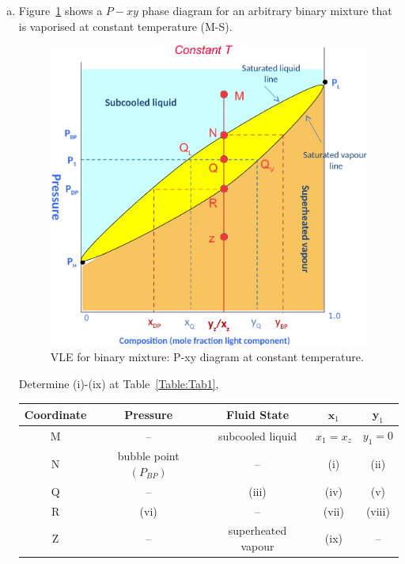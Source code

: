 \documentclass[calculator,allquestions,datasheet,Pens]{exam_newMarcus2}
\begin{document}
\begin{question}
  \begin{enumerate}[a)]
    \item Figure~\ref{Figure:Fig1} shows a $P-xy$ phase diagram for an arbitrary binary mixture that is vaporised at constant temperature (M-S).
      \begin{figure}[h]
        \begin{center}
          \includegraphics[width=.5\linewidth,clip]{./Pics/VLE_Pxy_Diagram3b}
          \caption{VLE for binary mixture: P-xy diagram at constant temperature.}\label{Figure:Fig1}
        \end{center}
      \end{figure}
      Determine (i)-(ix) at Table~\ref{Table:Tab1},
      \begin{table}[h]
        \begin{center}
          \begin{tabular}{||c| c | c | c | c ||}
            \hline\hline
            {\bf Coordinate} & {\bf Pressure} & {\bf Fluid State} & $\mathbf{x}_{1}$ & $\mathbf{y}_{1}$ \\
            \hline
                 M           &   --           &   subcooled liquid & $x_{1}=x_{z}$    & $y_{1}=0$        \\
                 N           &bubble point $\left(P_{BP}\right)$&--& (i)             & (ii)            \\
                 Q           &  --            &     (iii)          & (iv)             & (v)            \\
                 R           &  (vi)          &     --             & (vii)             & (viii)            \\
                 Z           &  --           &     superheated vapour   & (ix)         &  --            \\                 
            \hline\hline

\end{tabular}
\end{center}
\end{table}
\end{enumerate}
\end{question}
\end{document}
